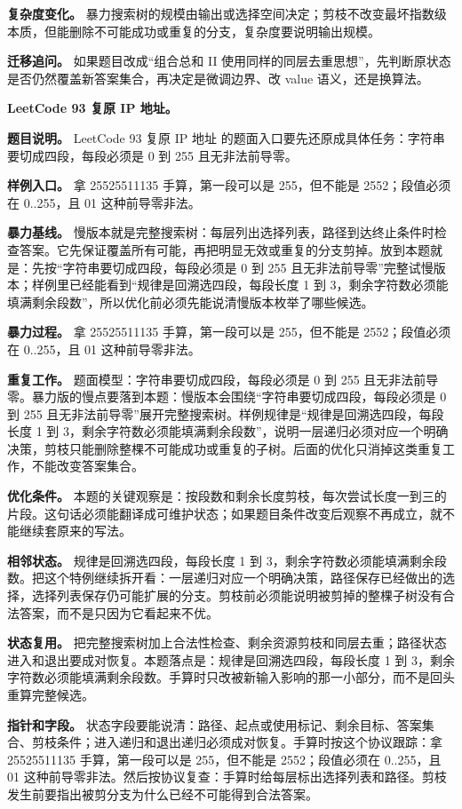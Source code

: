 \textbf{复杂度变化。} 暴力搜索树的规模由输出或选择空间决定；剪枝不改变最坏指数级本质，但能删除不可能成功或重复的分支，复杂度要说明输出规模。

\textbf{迁移追问。} 如果题目改成“组合总和 II 使用同样的同层去重思想”，先判断原状态是否仍然覆盖新答案集合，再决定是微调边界、改 value 语义，还是换算法。

\noindent\textbf{LeetCode 93 复原 IP 地址。}

\textbf{题目说明。} LeetCode 93 复原 IP 地址 的题面入口要先还原成具体任务：字符串要切成四段，每段必须是 0 到 255 且无非法前导零。

\textbf{样例入口。} 拿 25525511135 手算，第一段可以是 255，但不能是 2552；段值必须在 0..255，且 01 这种前导零非法。

\textbf{暴力基线。} 慢版本就是完整搜索树：每层列出选择列表，路径到达终止条件时检查答案。它先保证覆盖所有可能，再把明显无效或重复的分支剪掉。放到本题就是：先按“字符串要切成四段，每段必须是 0 到 255 且无非法前导零”完整试慢版本；样例里已经能看到“规律是回溯选四段，每段长度 1 到 3，剩余字符数必须能填满剩余段数”，所以优化前必须先能说清慢版本枚举了哪些候选。

\textbf{暴力过程。} 拿 25525511135 手算，第一段可以是 255，但不能是 2552；段值必须在 0..255，且 01 这种前导零非法。

\textbf{重复工作。} 题面模型：字符串要切成四段，每段必须是 0 到 255 且无非法前导零。暴力版的慢点要落到本题：慢版本会围绕“字符串要切成四段，每段必须是 0 到 255 且无非法前导零”展开完整搜索树。样例规律是“规律是回溯选四段，每段长度 1 到 3，剩余字符数必须能填满剩余段数”，说明一层递归必须对应一个明确决策，剪枝只能删除整棵不可能成功或重复的子树。后面的优化只消掉这类重复工作，不能改变答案集合。

\textbf{优化条件。} 本题的关键观察是：按段数和剩余长度剪枝，每次尝试长度一到三的片段。这句话必须能翻译成可维护状态；如果题目条件改变后观察不再成立，就不能继续套原来的写法。

\textbf{相邻状态。} 规律是回溯选四段，每段长度 1 到 3，剩余字符数必须能填满剩余段数。把这个特例继续拆开看：一层递归对应一个明确决策，路径保存已经做出的选择，选择列表保存仍可能扩展的分支。剪枝前必须能说明被剪掉的整棵子树没有合法答案，而不是只因为它看起来不优。

\textbf{状态复用。} 把完整搜索树加上合法性检查、剩余资源剪枝和同层去重；路径状态进入和退出要成对恢复。本题落点是：规律是回溯选四段，每段长度 1 到 3，剩余字符数必须能填满剩余段数。手算时只改被新输入影响的那一小部分，而不是回头重算完整候选。

\textbf{指针和字段。} 状态字段要能说清：路径、起点或使用标记、剩余目标、答案集合、剪枝条件；进入递归和退出递归必须成对恢复。手算时按这个协议跟踪：拿 25525511135 手算，第一段可以是 255，但不能是 2552；段值必须在 0..255，且 01 这种前导零非法。然后按协议复查：手算时给每层标出选择列表和路径。剪枝发生前要指出被剪分支为什么已经不可能得到合法答案。

